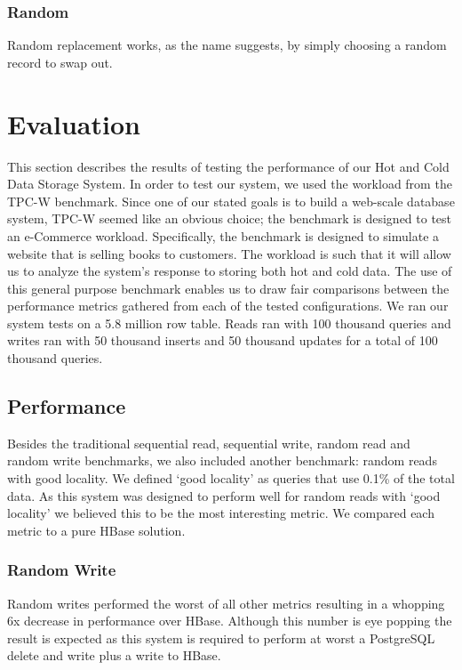 \documentclass[12pt]{article}
\begin{document}
\subsubsection{Random}
Random replacement works, as the name suggests, by simply choosing a random record to swap out. 

\section{Evaluation}
This section describes the results of testing the performance of our Hot and Cold Data Storage System. In order to test our system, we used the workload from the TPC-W benchmark. Since one of our stated goals is to build a web-scale database system, TPC-W seemed like an obvious choice; the benchmark is designed to test an e-Commerce workload. Specifically, the benchmark is designed to simulate a website that is selling books to customers. The workload is such that it will allow us to analyze the system’s response to storing both hot and cold data. The use of this general purpose benchmark enables us to draw fair comparisons between the performance metrics gathered from each of the tested configurations. We ran our system tests on a 5.8 million row table. Reads ran with 100 thousand queries and writes ran with 50 thousand inserts and 50 thousand updates for a total of 100 thousand queries.

\subsection {Performance}
Besides the traditional sequential read, sequential write, random read and random write benchmarks, we also included another benchmark: random reads with good locality. We defined ‘good locality’ as queries that use 0.1\% of the total data. As this system was designed to perform well for random reads with ‘good locality’ we believed this to be the most interesting metric. We compared each metric to a pure HBase solution.

\subsubsection{Random Write}
Random writes performed the worst of all other metrics resulting in a whopping 6x decrease in performance over HBase. Although this number is eye popping the result is expected as this system is required to perform at worst a PostgreSQL delete and write plus a write to HBase. 
\end{document}
